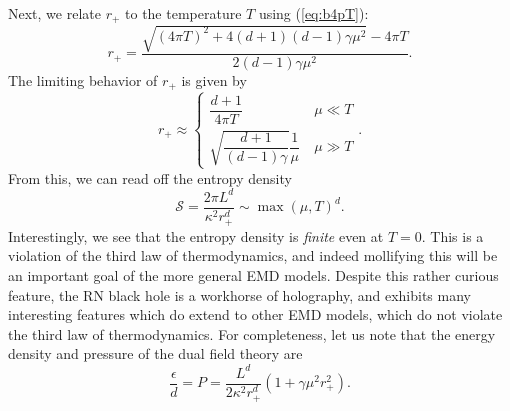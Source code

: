 \documentclass[10pt, oneside]{book}
\begin{document}
\begin{doublespace}
Next, we relate $r_+$ to the temperature $T$ using (\ref{eq:b4pT}): \begin{equation}
r_+ = \frac{\sqrt{(4\pi T)^2 + 4(d+1)(d-1)\gamma \mu^2} -4\pi T}{2(d-1)\gamma \mu^2}.
\end{equation}
The limiting behavior of $r_+$ is given by \begin{equation}
r_+ \approx \left\lbrace\begin{array}{ll}  \displaystyle \dfrac{d+1}{4\pi T} &\ \mu \ll T \\ \displaystyle  \sqrt{\dfrac{d+1}{(d-1)\gamma}} \dfrac{1}{\mu} &\ \mu \gg T  \end{array}\right..
\end{equation}
From this, we can read off the entropy density \begin{equation}
\mathcal{S} = \frac{2\pi L^d}{\kappa^2 r_+^d} \sim \max(\mu,T)^d.
\end{equation}
Interestingly, we see that the entropy density is \emph{finite} even at $T=0$.   This is a violation of the third law of thermodynamics, and indeed mollifying this will be an important goal of the more general EMD models.   Despite this rather curious feature, the RN black hole is a workhorse of holography, and exhibits many interesting features which do extend to other EMD models, which do not violate the third law of thermodynamics.   For completeness, let us note that the energy density and pressure of the dual field theory are \begin{equation}
\frac{\epsilon}{d} = P = \frac{L^d}{2\kappa^2 r_+^d} \left(1+\gamma \mu^2 r_+^2\right).  \label{eq:AdSRNpressure}
\end{equation}




\end{doublespace}
\end{document}
